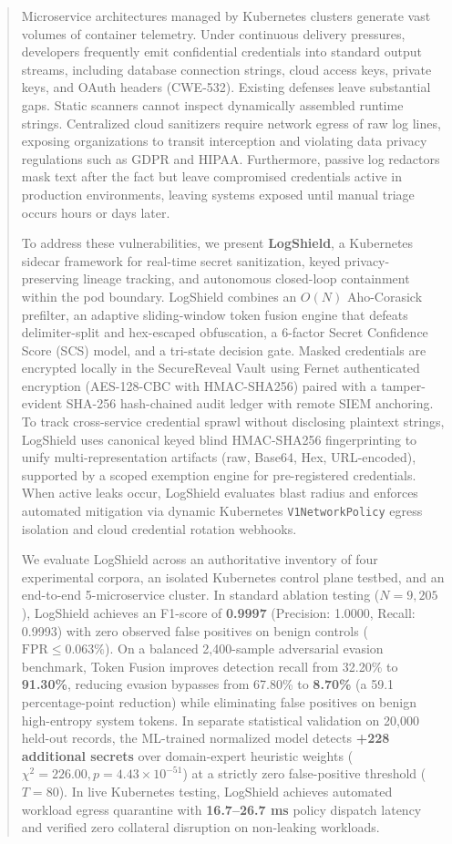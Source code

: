 \documentclass[conference]{IEEEtran}
\begin{document}
\begin{abstract}
Microservice architectures managed by Kubernetes clusters generate vast volumes of container telemetry. Under continuous delivery pressures, developers frequently emit confidential credentials into standard output streams, including database connection strings, cloud access keys, private keys, and OAuth headers (CWE-532). Existing defenses leave substantial gaps. Static scanners cannot inspect dynamically assembled runtime strings. Centralized cloud sanitizers require network egress of raw log lines, exposing organizations to transit interception and violating data privacy regulations such as GDPR and HIPAA. Furthermore, passive log redactors mask text after the fact but leave compromised credentials active in production environments, leaving systems exposed until manual triage occurs hours or days later.

To address these vulnerabilities, we present \textbf{LogShield}, a Kubernetes sidecar framework for real-time secret sanitization, keyed privacy-preserving lineage tracking, and autonomous closed-loop containment within the pod boundary. LogShield combines an $O(N)$ Aho-Corasick prefilter, an adaptive sliding-window token fusion engine that defeats delimiter-split and hex-escaped obfuscation, a 6-factor Secret Confidence Score (SCS) model, and a tri-state decision gate. Masked credentials are encrypted locally in the SecureReveal Vault using Fernet authenticated encryption (AES-128-CBC with HMAC-SHA256) paired with a tamper-evident SHA-256 hash-chained audit ledger with remote SIEM anchoring. To track cross-service credential sprawl without disclosing plaintext strings, LogShield uses canonical keyed blind HMAC-SHA256 fingerprinting to unify multi-representation artifacts (raw, Base64, Hex, URL-encoded), supported by a scoped exemption engine for pre-registered credentials. When active leaks occur, LogShield evaluates blast radius and enforces automated mitigation via dynamic Kubernetes \texttt{V1NetworkPolicy} egress isolation and cloud credential rotation webhooks.

We evaluate LogShield across an authoritative inventory of four experimental corpora, an isolated Kubernetes control plane testbed, and an end-to-end 5-microservice cluster. In standard ablation testing ($N=9,205$), LogShield achieves an F1-score of \textbf{0.9997} (Precision: 1.0000, Recall: 0.9993) with zero observed false positives on benign controls ($\text{FPR} \le 0.063\%$). On a balanced 2,400-sample adversarial evasion benchmark, Token Fusion improves detection recall from 32.20\% to \textbf{91.30\%}, reducing evasion bypasses from 67.80\% to \textbf{8.70\%} (a 59.1 percentage-point reduction) while eliminating false positives on benign high-entropy system tokens. In separate statistical validation on 20,000 held-out records, the ML-trained normalized model detects \textbf{+228 additional secrets} over domain-expert heuristic weights ($\chi^2 = 226.00, p = 4.43 \times 10^{-51}$) at a strictly zero false-positive threshold ($T=80$). In live Kubernetes testing, LogShield achieves automated workload egress quarantine with \textbf{16.7--26.7 ms} policy dispatch latency and verified zero collateral disruption on non-leaking workloads.
\end{abstract}
\end{document}
